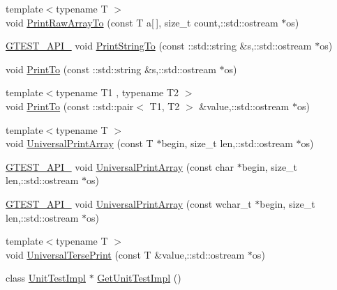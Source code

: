 \begin{DoxyCompactItemize}
\item 
{\footnotesize template$<$typename T $>$ }\\void \hyperlink{namespacetesting_1_1internal_aba630c2fa49dd2b4bce3de24e70aec9f}{Print\+Raw\+Array\+To} (const T a\mbox{[}$\,$\mbox{]}, size\+\_\+t count,\+::std\+::ostream $\ast$os)
\item 
\hyperlink{gtest-port_8h_aa73be6f0ba4a7456180a94904ce17790}{G\+T\+E\+S\+T\+\_\+\+A\+P\+I\+\_\+} void \hyperlink{namespacetesting_1_1internal_a0b11505e1a4527c1f1d8c1c5cdfb71b5}{Print\+String\+To} (const \+::std\+::string \&s,\+::std\+::ostream $\ast$os)
\item 
void \hyperlink{namespacetesting_1_1internal_a1bcff7765fb78cedada8d09f7159ab7e}{Print\+To} (const \+::std\+::string \&s,\+::std\+::ostream $\ast$os)
\item 
{\footnotesize template$<$typename T1 , typename T2 $>$ }\\void \hyperlink{namespacetesting_1_1internal_a5759c5abed8ebab0e1a8a0f8aadab768}{Print\+To} (const \+::std\+::pair$<$ T1, T2 $>$ \&value,\+::std\+::ostream $\ast$os)
\item 
{\footnotesize template$<$typename T $>$ }\\void \hyperlink{namespacetesting_1_1internal_a73b5046a2ed65d0e2fb7cdc9bdaee3fe}{Universal\+Print\+Array} (const T $\ast$begin, size\+\_\+t len,\+::std\+::ostream $\ast$os)
\item 
\hyperlink{gtest-port_8h_aa73be6f0ba4a7456180a94904ce17790}{G\+T\+E\+S\+T\+\_\+\+A\+P\+I\+\_\+} void \hyperlink{namespacetesting_1_1internal_a3fac293aeb6e7e6b3ff3e27404f6588b}{Universal\+Print\+Array} (const char $\ast$begin, size\+\_\+t len,\+::std\+::ostream $\ast$os)
\item 
\hyperlink{gtest-port_8h_aa73be6f0ba4a7456180a94904ce17790}{G\+T\+E\+S\+T\+\_\+\+A\+P\+I\+\_\+} void \hyperlink{namespacetesting_1_1internal_ae95ea0aea80977c0870df98b27a17cac}{Universal\+Print\+Array} (const wchar\+\_\+t $\ast$begin, size\+\_\+t len,\+::std\+::ostream $\ast$os)
\item 
{\footnotesize template$<$typename T $>$ }\\void \hyperlink{namespacetesting_1_1internal_ab3d834fb6c31d29e36400cc19905294b}{Universal\+Terse\+Print} (const T \&value,\+::std\+::ostream $\ast$os)
\item 
class \hyperlink{classtesting_1_1internal_1_1_unit_test_impl}{Unit\+Test\+Impl} $\ast$ \hyperlink{namespacetesting_1_1internal_a9bd0caf5d16512de38b39599c13ee634}{Get\+Unit\+Test\+Impl} ()
\item 

\end{DoxyCompactItemize}
